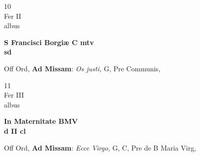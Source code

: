 \documentclass[10pt, openany]{book}
\begin{document}
        \begin{center}
            \begin{minipage}{3.5in}
                \vspace{2em}
                \begin{minipage}{0.5in}
                    {\Huge 10} \\
                    {\normalsize Fer II} \\
                    {\normalsize albus}
                \end{minipage}
                \begin{minipage}{3.0in}
                    \textbf{ \large S Francisci Borgiæ C mtv \\
                    \textnormal{\normalsize sd}} \\ 
                \end{minipage}
                \begin{justify}Off Ord, \textbf{Ad Missam}: \textit{Os justi,} G, Pre Communis,  
                \end{justify}
            \end{minipage}
        \end{center}
    
        \begin{center}
            \begin{minipage}{3.5in}
                \vspace{2em}
                \begin{minipage}{0.5in}
                    {\Huge 11} \\
                    {\normalsize Fer III} \\
                    {\normalsize albus}
                \end{minipage}
                \begin{minipage}{3.0in}
                    \textbf{ \large In Maternitate BMV \\
                    \textnormal{\normalsize d II cl}} \\ 
                \end{minipage}
                \begin{justify}Off Ord, \textbf{Ad Missam}: \textit{Ecce Virgo,} G, C, Pre de B Maria Virg,  
                \end{justify}
            \end{minipage}
        \end{center}
    
\end{document}
